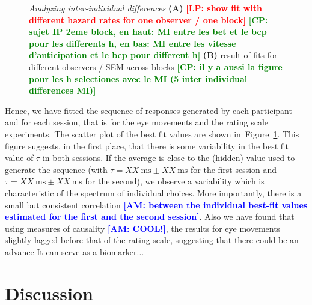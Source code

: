 \documentclass[12pt,english]{article}%
\newcommand{\ms}{\si{\milli\second}}%
\newcommand{\seeFig}[1]{Figure~\ref{fig:#1}}
\newcommand{\LP}[1]{\textbf{\textcolor{red}{[LP: #1]}}}
\newcommand{\AM}[1]{\textbf{\textcolor{blue}{[AM: #1]}}}
\newcommand{\CP}[1]{\textbf{\textcolor{green}{[CP: #1]}}}
\begin{document}
\begin{figure}
{
}


%	
\caption{\emph{Analyzing inter-individual differences}
\textbf{(A)}
\LP{ show fit with different hazard rates for one observer / one block}
\CP{sujet IP 2eme block,  en haut: MI entre les bet et le bcp pour les differents h, en bas: MI entre les vitesse d'anticipation et le bcp pour different h}
\textbf{(B)}
result of fits for different observers / SEM across blocks
\CP{il y a aussi la figure pour les h selectiones avec le MI (5 inter individual differences MI)}
}
\label{fig:results_inter}
\end{figure}
Hence, we have fitted the sequence of responses generated by each participant and
for each session, that is for the eye movements and the rating scale experiments.
The scatter plot of the best fit values are shown in~\seeFig{results_inter}.
This figure suggests, in the first place, that there is some variability in the best fit value of $\tau$
in both sessions.
If the average is close to the (hidden) value used to generate the sequence
(with $\tau = XX~\ms \pm XX~\ms$ for the first session and
 $\tau = XX~\ms \pm XX~\ms$ for the second),
 we observe a variability which is characteristic of the spectrum of individual choices.
More importantly, there is a small but consistent
correlation \AM{between the individual best-fit values estimated for the first and the second session}.
Also we have found that using measures of causality \AM{COOL!},
the results for eye movements slightly lagged before
that of the rating scale,
suggesting that there could be an advance
It can serve as a biomarker...


\section{Discussion}
\end{document}

